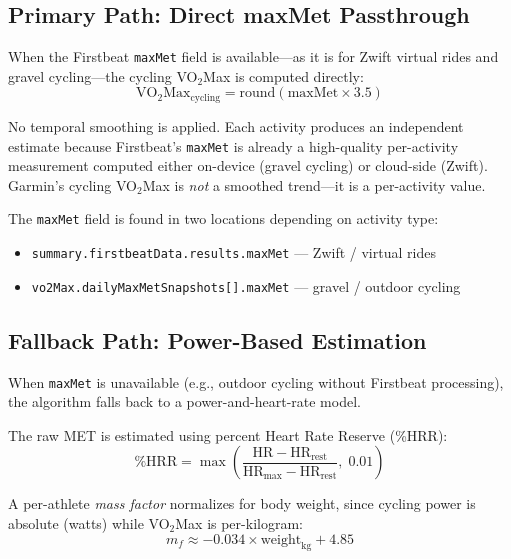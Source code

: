 \documentclass[11pt,a4paper]{article}
\begin{document}
\subsection{Primary Path: Direct maxMet Passthrough}

When the Firstbeat \texttt{maxMet} field is available---as it is for Zwift virtual rides and gravel cycling---the cycling VO$_2$Max is computed directly:
\begin{equation}
\text{VO}_2\text{Max}_{\text{cycling}} = \text{round}(\text{maxMet} \times 3.5)
\label{eq:cycling-maxmet}
\end{equation}

No temporal smoothing is applied.
Each activity produces an independent estimate because Firstbeat's \texttt{maxMet} is already a high-quality per-activity measurement computed either on-device (gravel cycling) or cloud-side (Zwift).
Garmin's cycling VO$_2$Max is \emph{not} a smoothed trend---it is a per-activity value.

The \texttt{maxMet} field is found in two locations depending on activity type:
\begin{itemize}[nosep]
    \item \texttt{summary.firstbeatData.results.maxMet} --- Zwift / virtual rides
    \item \texttt{vo2Max.dailyMaxMetSnapshots[].maxMet} --- gravel / outdoor cycling
\end{itemize}

\subsection{Fallback Path: Power-Based Estimation}
\label{sec:cycling-fallback}

When \texttt{maxMet} is unavailable (e.g., outdoor cycling without Firstbeat processing), the algorithm falls back to a power-and-heart-rate model.

The raw MET is estimated using percent Heart Rate Reserve (\%HRR):
\begin{equation}
\%\text{HRR} = \max\!\left(\frac{\text{HR} - \text{HR}_{\text{rest}}}{\text{HR}_{\text{max}} - \text{HR}_{\text{rest}}},\; 0.01\right)
\label{eq:pcthrr}
\end{equation}

A per-athlete \emph{mass factor} normalizes for body weight, since cycling power is absolute (watts) while VO$_2$Max is per-kilogram:
\begin{equation}
m_f \approx -0.034 \times \text{weight}_{\text{kg}} + 4.85
\label{eq:mass-factor}
\end{equation}
\end{document}
